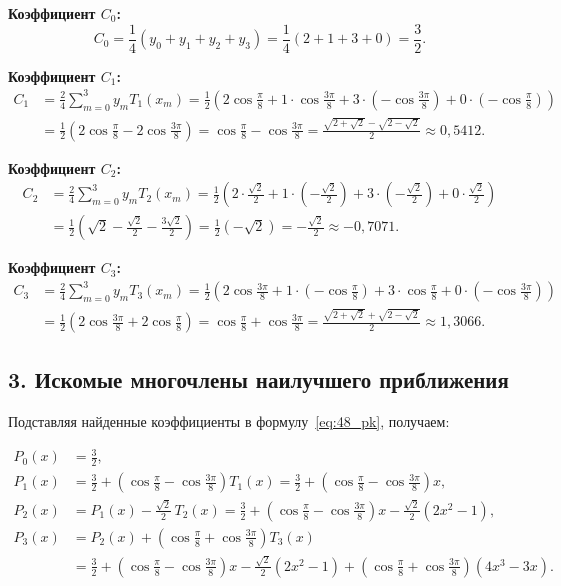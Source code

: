 \documentclass{article}
\begin{document}
\textbf{Коэффициент $C_0$:}
\begin{equation}
C_0 = \frac{1}{4}(y_0 + y_1 + y_2 + y_3) = \frac{1}{4}(2 + 1 + 3 + 0) = \frac{3}{2}.
\end{equation}

\textbf{Коэффициент $C_1$:}
\begin{align}
C_1 &= \frac{2}{4} \sum_{m=0}^{3} y_m T_1(x_m) = \frac{1}{2}\left(2\cos\frac{\pi}{8} + 1\cdot\cos\frac{3\pi}{8} + 3\cdot\left(-\cos\frac{3\pi}{8}\right) + 0\cdot\left(-\cos\frac{\pi}{8}\right)\right) \nonumber \\
&= \frac{1}{2}\left(2\cos\frac{\pi}{8} - 2\cos\frac{3\pi}{8}\right) = \cos\frac{\pi}{8} - \cos\frac{3\pi}{8} = \frac{\sqrt{2+\sqrt{2}} - \sqrt{2-\sqrt{2}}}{2} \approx 0{,}5412.
\end{align}

\textbf{Коэффициент $C_2$:}
\begin{align}
C_2 &= \frac{2}{4} \sum_{m=0}^{3} y_m T_2(x_m) = \frac{1}{2}\left(2\cdot\frac{\sqrt{2}}{2} + 1\cdot\left(-\frac{\sqrt{2}}{2}\right) + 3\cdot\left(-\frac{\sqrt{2}}{2}\right) + 0\cdot\frac{\sqrt{2}}{2}\right) \nonumber \\
&= \frac{1}{2}\left(\sqrt{2} - \frac{\sqrt{2}}{2} - \frac{3\sqrt{2}}{2}\right) = \frac{1}{2}\left(-\sqrt{2}\right) = -\frac{\sqrt{2}}{2} \approx -0{,}7071.
\end{align}

\textbf{Коэффициент $C_3$:}
\begin{align}
C_3 &= \frac{2}{4} \sum_{m=0}^{3} y_m T_3(x_m) = \frac{1}{2}\left(2\cos\frac{3\pi}{8} + 1\cdot\left(-\cos\frac{\pi}{8}\right) + 3\cdot\cos\frac{\pi}{8} + 0\cdot\left(-\cos\frac{3\pi}{8}\right)\right) \nonumber \\
&= \frac{1}{2}\left(2\cos\frac{3\pi}{8} + 2\cos\frac{\pi}{8}\right) = \cos\frac{\pi}{8} + \cos\frac{3\pi}{8} = \frac{\sqrt{2+\sqrt{2}} + \sqrt{2-\sqrt{2}}}{2} \approx 1{,}3066.
\end{align}

\subsection*{3. Искомые многочлены наилучшего приближения}

Подставляя найденные коэффициенты в формулу~\eqref{eq:48_pk}, получаем:

\begin{align}
P_0(x) &= \frac{3}{2}, \\
P_1(x) &= \frac{3}{2} + \left(\cos\frac{\pi}{8} - \cos\frac{3\pi}{8}\right) T_1(x) = \frac{3}{2} + \left(\cos\frac{\pi}{8} - \cos\frac{3\pi}{8}\right) x, \\
P_2(x) &= P_1(x) - \frac{\sqrt{2}}{2}\, T_2(x) = \frac{3}{2} + \left(\cos\frac{\pi}{8} - \cos\frac{3\pi}{8}\right) x - \frac{\sqrt{2}}{2}(2x^2 - 1), \\
P_3(x) &= P_2(x) + \left(\cos\frac{\pi}{8} + \cos\frac{3\pi}{8}\right) T_3(x) \nonumber \\
&= \frac{3}{2} + \left(\cos\frac{\pi}{8} - \cos\frac{3\pi}{8}\right) x - \frac{\sqrt{2}}{2}(2x^2 - 1) + \left(\cos\frac{\pi}{8} + \cos\frac{3\pi}{8}\right)(4x^3 - 3x).
\end{align}
\end{document}
